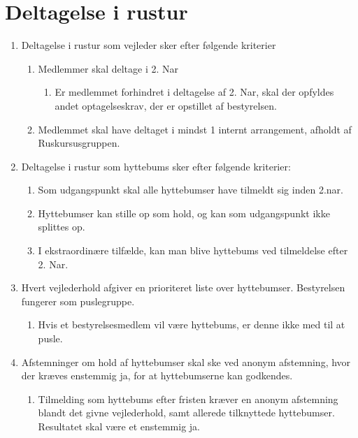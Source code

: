 \documentclass[a4paper, 10pt]{article}
\renewcommand\thesection{\textsection\arabic{section}}
\newenvironment{stykenum}{
  \begin{enumerate}[%
    label=Stk.~\arabic*:, ref=\thesection~Stk.~\arabic{enumi}, start=1]
}{\end{enumerate}}
\newenvironment{substykenum}{
  \begin{enumerate}[%
          label=Stk.~\arabic{enumi}.\arabic*:,
      ref=\thesection~Stk.~\arabic{enumi}.\arabic*, start=1]
}{\end{enumerate}}
\newenvironment{subsubstykenum}{
  \begin{enumerate}[%
      label=Stk.~\arabic{enumi}.\arabic{enumii}.\arabic*:,
      ref=\thesection~Stk.~\arabic{enumi}.\arabic{enumii}.\arabic*, start=1]
}{\end{enumerate}}
\begin{document}
\section{Deltagelse i rustur}
\begin{stykenum}
\item Deltagelse i rustur som vejleder sker efter følgende kriterier
    \begin{substykenum}
        \item Medlemmer skal deltage i 2. Nar
        \begin{subsubstykenum}
            \item Er medlemmet forhindret i deltagelse af 2. Nar, skal der
                opfyldes andet optagelseskrav, der er opstillet af bestyrelsen.
        \end{subsubstykenum}

        \item Medlemmet skal have deltaget i mindst 1 internt arrangement,
            afholdt af Ruskursusgruppen.
    \end{substykenum}

    \item Deltagelse i rustur som hyttebums sker efter følgende kriterier:
    \begin{substykenum}
        \item Som udgangspunkt skal alle hyttebumser have tilmeldt sig inden
            2.nar.
        \item Hyttebumser kan stille op som hold, og kan som udgangspunkt ikke
            splittes op.
        \item I ekstraordinære tilfælde, kan man blive hyttebums ved tilmeldelse
            efter 2. Nar.
    \end{substykenum}
    \item Hvert vejlederhold afgiver en prioriteret liste over hyttebumser.
        Bestyrelsen fungerer som puslegruppe.
        \begin{substykenum}
            \item Hvis et bestyrelsesmedlem vil være hyttebums, er denne ikke
                med til at pusle.
        \end{substykenum}
    \item Afstemninger om hold af hyttebumser skal ske ved anonym afstemning,
        hvor der kræves enstemmig ja, for at hyttebumserne kan godkendes.
        \begin{substykenum}
            \item Tilmelding som hyttebums efter fristen kræver en anonym
                afstemning blandt det givne vejlederhold, samt allerede
                tilknyttede hyttebumser. Resultatet skal være et enstemmig ja.
        \end{substykenum}
\end{stykenum}
\end{document}
